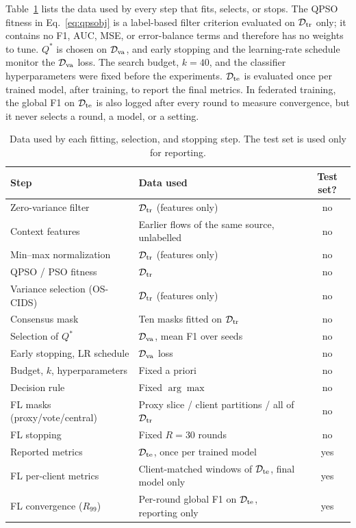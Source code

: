 \documentclass[conference]{IEEEtran}
\begin{document}
Table~\ref{tab:data_usage} lists the data
used by every step that fits, selects, or stops. The
QPSO fitness in Eq.~\eqref{eq:qpsobj} is a label-based filter criterion
evaluated on $\mathcal{D}_{\rm tr}$ only; it contains no F1, AUC,
MSE, or error-balance terms and therefore has no weights to tune.
$Q^{*}$ is chosen on $\mathcal{D}_{\rm va}$, and early stopping and
the learning-rate schedule monitor the $\mathcal{D}_{\rm va}$ loss.
The search budget, $k=40$, and the classifier hyperparameters were
fixed before the experiments. $\mathcal{D}_{\rm te}$ is evaluated
once per trained model, after training, to report the final
metrics. In federated training, the global F1 on $\mathcal{D}_{\rm te}$
is also logged after every round to measure convergence, but it never
selects a round, a model, or a setting.

\begin{table}[!t]
\centering
\scriptsize
\caption{Data used by each fitting,
selection, and stopping step. The test set is used only for
reporting.}
\label{tab:data_usage}
\setlength{\tabcolsep}{3pt}
\renewcommand{\arraystretch}{1.05}
\begin{tabular}{p{2.6cm} p{3.6cm} c}
\hline\toprule
\textbf{Step} & \textbf{Data used} & \textbf{Test set?} \\
\hline\toprule
Zero-variance filter & $\mathcal{D}_{\rm tr}$ (features only) & no \\
Context features & Earlier flows of the same source, unlabelled & no \\
Min--max normalization & $\mathcal{D}_{\rm tr}$ (features only) & no \\
QPSO / PSO fitness & $\mathcal{D}_{\rm tr}$ & no \\
Variance selection (OS-CIDS) & $\mathcal{D}_{\rm tr}$ (features only) & no \\
Consensus mask & Ten masks fitted on $\mathcal{D}_{\rm tr}$ & no \\
Selection of $Q^{*}$ & $\mathcal{D}_{\rm va}$, mean F1 over seeds & no \\
Early stopping, LR schedule & $\mathcal{D}_{\rm va}$ loss & no \\
Budget, $k$, hyperparameters & Fixed a priori & no \\
Decision rule & Fixed $\arg\max$ & no \\
FL masks (proxy/vote/central) & Proxy slice / client partitions / all of $\mathcal{D}_{\rm tr}$ & no \\
FL stopping & Fixed $R=30$ rounds & no \\
\midrule
Reported metrics & $\mathcal{D}_{\rm te}$, once per trained model & yes \\
FL per-client metrics & Client-matched windows of $\mathcal{D}_{\rm te}$, final model only & yes \\
FL convergence ($R_{99}$) & Per-round global F1 on $\mathcal{D}_{\rm te}$, reporting only & yes \\
\hline\toprule
\end{tabular}
\end{table}
\end{document}
